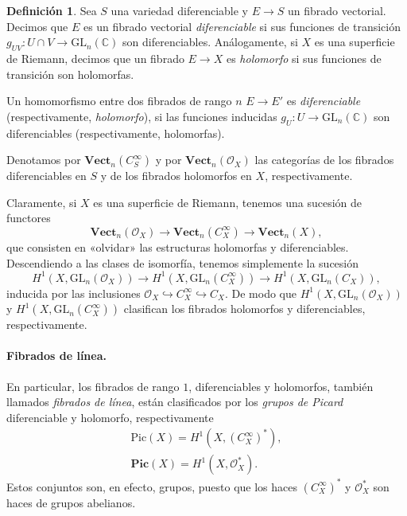 \documentclass[12pt,a4paper]{article}
\theoremstyle{definition} \newtheorem{defn}[thm]{Definición}
\theoremstyle{definition} \newtheorem{ejemplo}[thm]{Ejemplo}
\theoremstyle{definition} \newtheorem{ejercicio}[thm]{Ejercicio}
\def\CC{\mathbb{C}}
\def\OO{\mathscr{O}}
\def\GL{\mathrm{GL}}
\begin{document}
	  \begin{defn}
	    Sea $S$ una variedad diferenciable y $E\rightarrow S$ un fibrado vectorial. Decimos que $E$ es un fibrado vectorial \emph{diferenciable} si sus funciones de transición $g_{UV}:U\cap V \rightarrow \GL_n(\CC)$ son diferenciables. Análogamente, si $X$ es una superficie de Riemann, decimos que un fibrado $E\rightarrow X$ es \emph{holomorfo} si sus funciones de transición son holomorfas.

	    Un homomorfismo entre dos fibrados de rango $n$ $E\rightarrow E'$ es \emph{diferenciable} (respectivamente, \emph{holomorfo}), si las funciones inducidas $g_U:U\rightarrow \GL_n(\CC)$ son diferenciables (respectivamente, holomorfas).

	    Denotamos por $\mathbf{Vect}_{n}(C^\infty_S)$ y por $\mathbf{Vect}_{n}(\OO_X)$ las categorías de los fibrados diferenciables en $S$ y de los fibrados holomorfos en $X$, respectivamente.
	  \end{defn}

	  Claramente, si $X$ es una superficie de Riemann, tenemos una sucesión de functores
	  \begin{equation*}
	    \mathbf{Vect}_n(\OO_X) \longrightarrow \mathbf{Vect}_n(C^\infty_X) \longrightarrow \mathbf{Vect}_n(X),
	  \end{equation*}
	  que consisten en «olvidar» las estructuras holomorfas y diferenciables. Descendiendo a las clases de isomorfía, tenemos simplemente la sucesión
	  \begin{equation*}
	    H^1(X,\GL_n(\OO_X)) \longrightarrow H^1(X,\GL_n(C^\infty_X)) \longrightarrow H^1(X,\GL_n(C_X)),
	  \end{equation*}
	  inducida por las inclusiones $\OO_X \hookrightarrow C^\infty_X \hookrightarrow C_X$.
	  De modo que $H^1(X,\GL_n(\OO_X))$ y $H^1(X,\GL_n(C^\infty_X))$ clasifican los fibrados holomorfos y diferenciables, respectivamente.

	  \paragraph{Fibrados de línea.}	  En particular, los fibrados de rango $1$, diferenciables y holomorfos, también llamados \emph{fibrados de línea}, están clasificados por los \emph{grupos de Picard} diferenciable y holomorfo, respectivamente
	  \begin{align*}
	    \mathrm{Pic}(X)=H^1(X,(C^\infty_X)^*), \\
	    \mathbf{Pic}(X)=H^1(X,\OO^*_X).
	  \end{align*}
	  Estos conjuntos son, en efecto, grupos, puesto que los haces $(C^\infty_X)^*$ y $\OO^*_X$ son haces de grupos abelianos.
\end{document}
